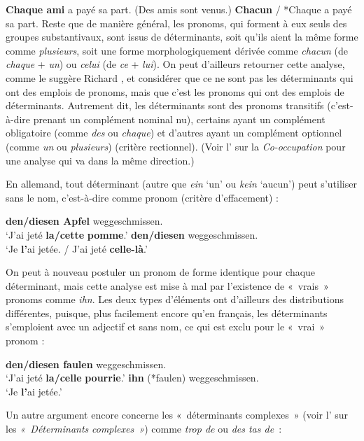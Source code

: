\ea \textbf{{Chaque ami}}  {a payé sa part.}
\ex ({Des amis sont venus.}) \textbf{{Chacun} }{/}  {*Chaque a payé sa part.}
\z
Reste que de manière général, les pronoms, qui forment à eux seuls des groupes substantivaux, sont issus de déterminants, soit qu’ils aient la même forme comme \textit{plusieurs}, soit une forme morphologiquement dérivée comme \textit{chacun} (de \textit{chaque} + \textit{un}) ou \textit{celui} (de \textit{ce} + \textit{lui}). On peut d’ailleurs retourner cette analyse, comme le suggère Richard \citet[192]{Hudson2007}, et considérer que ce ne sont pas les déterminants qui ont des emplois de pronoms, mais que c’est les pronoms qui ont des emplois de déterminants. Autrement dit, les déterminants sont des pronoms transitifs (c’est-à-dire prenant un complément nominal nu), certains ayant un complément obligatoire (comme \textit{des} ou \textit{chaque}) et d’autres ayant un complément optionnel (comme \textit{un} ou \textit{plusieurs}) (critère rectionnel). (Voir l’ sur la \textit{Co-occupation} pour une analyse qui va dans la même direction.)

En allemand, tout déterminant (autre que \textit{ein} ‘un’ ou \textit{kein} ‘aucun’) peut s’utiliser sans le nom, c’est-à-dire comme pronom (critère d’effacement) :

 \textbf{{den/diesen}  {Apfel}}  {weggeschmissen.}\\
\glt ‘J’ai jeté \textbf{la/cette} \textbf{pomme}.’
 \textbf{{den/diesen}}  {weggeschmissen.}\\
\glt ‘Je \textbf{l’}ai jetée. / J’ai jeté \textbf{celle-là}.’
\z

On peut à nouveau postuler un pronom de forme identique pour chaque déterminant, mais cette analyse est mise à mal par l’existence de «~vrais~» pronoms comme \textit{ihn}. Les deux types d’éléments ont d’ailleurs des distributions différentes, puisque, plus facilement encore qu’en français, les déterminants s’emploient avec un adjectif et sans nom, ce qui est exclu pour le «~vrai~» pronom :

 \textbf{{den/diesen}  {faulen} } {weggeschmissen.}\\
\glt ‘J’ai jeté \textbf{la/celle} \textbf{pourrie}.’
 \textbf{{ihn}} (*{faulen})  {weggeschmissen.}\\
\glt ‘Je \textbf{l’}ai jetée.’
\z

Un autre argument encore concerne les «~déterminants complexes~» (voir l’ sur les \textit{«~Déterminants} \textit{complexes~»}) comme \textit{trop de} ou \textit{des tas de~}:

